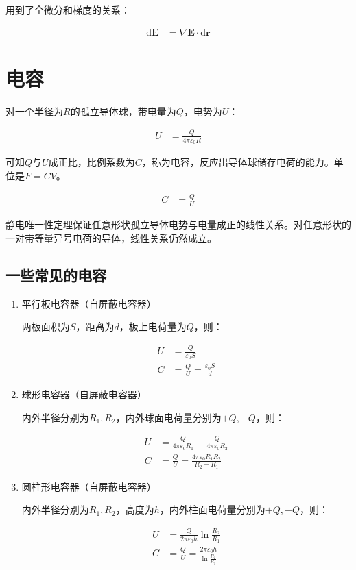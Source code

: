 \documentclass[12pt,onecolumn,a4paper]{book}
\numberwithin{table}{subsection}
\numberwithin{equation}{subsection}
\begin{document}
用到了全微分和梯度的关系：

\begin{align}
    \mathrm{d} \mathbf{E} & = \nabla \mathbf{E} \cdot \mathrm{d} \mathbf{r}
\end{align}

\section{电容}

对一个半径为$R$的孤立导体球，带电量为$Q$，电势为$U$：

\begin{align}
    U & = \frac{Q}{4\pi\varepsilon_0 R}
\end{align}

可知$Q$与$U$成正比，比例系数为$C$，称为电容，反应出导体球储存电荷的能力。单位是$F=CV$。

\begin{align}
    C & = \frac{Q}{U}
\end{align}

静电唯一性定理保证任意形状孤立导体电势与电量成正的线性关系。对任意形状的一对带等量异号电荷的导体，线性关系仍然成立。

\subsection{一些常见的电容}

\begin{enumerate}
    \item 平行板电容器（自屏蔽电容器）

          两板面积为$S$，距离为$d$，板上电荷量为$Q$，则：

          \begin{align}
              U & = \frac{Q}{\varepsilon_0 S}               \\
              C & = \frac{Q}{U} = \frac{\varepsilon_0 S}{d}
          \end{align}


    \item 球形电容器（自屏蔽电容器）

          内外半径分别为$R_1,R_2$，内外球面电荷量分别为$+Q,-Q$，则：

          \begin{align}
              U & = \frac{Q}{4\pi\varepsilon_0 R_1} - \frac{Q}{4\pi\varepsilon_0 R_2} \\
              C & = \frac{Q}{U} = \frac{4\pi\varepsilon_0 R_1 R_2}{R_2-R_1}
          \end{align}


    \item 圆柱形电容器（自屏蔽电容器）

          内外半径分别为$R_1,R_2$，高度为$h$，内外柱面电荷量分别为$+Q,-Q$，则：

          \begin{align}
              U & = \frac{Q}{2\pi\varepsilon_0 h} \ln \frac{R_2}{R_1}             \\
              C & = \frac{Q}{U} = \frac{2\pi\varepsilon_0 h}{\ln \frac{R_2}{R_1}}
          \end{align}

\end{enumerate}
\end{document}
